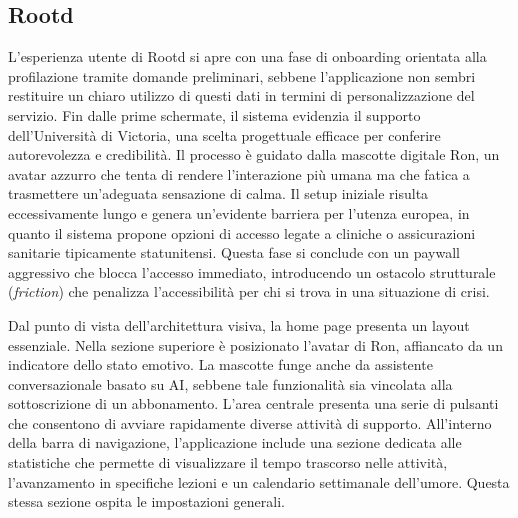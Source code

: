 \subsection{Rootd}
\label{subsec:rootd}

L'esperienza utente di Rootd si apre con una fase di onboarding orientata alla profilazione tramite domande preliminari, sebbene l'applicazione non sembri restituire un chiaro utilizzo di questi dati in termini di personalizzazione del servizio.
Fin dalle prime schermate, il sistema evidenzia il supporto dell'Università di Victoria, una scelta progettuale efficace per conferire autorevolezza e credibilità.
Il processo è guidato dalla mascotte digitale Ron, un avatar azzurro che tenta di rendere l'interazione più umana ma che fatica a trasmettere un'adeguata sensazione di calma.
Il setup iniziale risulta eccessivamente lungo e genera un'evidente barriera per l'utenza europea, in quanto il sistema propone opzioni di accesso legate a cliniche o assicurazioni sanitarie tipicamente statunitensi.
Questa fase si conclude con un paywall aggressivo che blocca l'accesso immediato, introducendo un ostacolo strutturale (\textit{friction}) che penalizza l'accessibilità per chi si trova in una situazione di crisi.

Dal punto di vista dell'architettura visiva, la home page presenta un layout essenziale.
Nella sezione superiore è posizionato l'avatar di Ron, affiancato da un indicatore dello stato emotivo.
La mascotte funge anche da assistente conversazionale basato su AI, sebbene tale funzionalità sia vincolata alla sottoscrizione di un abbonamento.
L'area centrale presenta una serie di pulsanti che consentono di avviare rapidamente diverse attività di supporto.
All'interno della barra di navigazione, l'applicazione include una sezione dedicata alle statistiche che permette di visualizzare il tempo trascorso nelle attività, l'avanzamento in specifiche lezioni e un calendario settimanale dell'umore.
Questa stessa sezione ospita le impostazioni generali.

